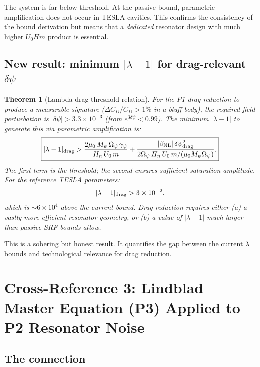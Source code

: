\documentclass[11pt,twocolumn]{article}
\newcommand{\dpsi}{\delta\psi}
\newcommand{\lam}{\lambda}
\newcommand{\Opsi}{\Omega_\psi}
\newcommand{\gpsi}{\gamma_\psi}
\newcommand{\Mpsi}{M_\psi}
\newtheorem{theorem}{Theorem}
\begin{document}
The system is far below threshold. At the passive bound, parametric
amplification does not occur in TESLA cavities. This confirms the
consistency of the bound derivation but means that a \emph{dedicated}
resonator design with much higher $U_0 H m$ product is essential.

\subsection{New result: minimum $|\lam-1|$ for drag-relevant $\dpsi$}

\begin{theorem}[Lambda-drag threshold relation]
\label{thm:lambda_drag}
For the P1 drag reduction to produce a measurable signature
($\Delta C_D/C_D > 1\%$ in a bluff body), the required field
perturbation is $|\dpsi| > 3.3\times10^{-3}$ (from $e^{3\dpsi} < 0.99$).
The minimum $|\lam-1|$ to generate this via parametric amplification is:
\begin{equation}
\boxed{
|\lam-1|_{\rm drag} > \frac{2\mu_0\,\Mpsi\,\Opsi\,\gpsi}
{H_n\,U_0\,m}
+ \frac{|\beta_{\rm NL}|\,\dpsi_{\rm drag}^2}{2\Opsi\,H_n\,U_0\,m/(\mu_0\Mpsi\Opsi)}.
}
\label{eq:lambda_drag}
\end{equation}
The first term is the threshold; the second ensures sufficient
saturation amplitude. For the reference TESLA parameters:
\begin{equation}
|\lam-1|_{\rm drag} > 3\times10^{-2},
\end{equation}
which is $\sim 6\times10^4$ above the current bound. Drag reduction
requires either (a) a vastly more efficient resonator geometry, or
(b) a value of $|\lam-1|$ much larger than passive SRF bounds allow.
\end{theorem}

This is a sobering but honest result. It quantifies the gap between
the current $\lam$ bounds and technological relevance for drag reduction.


\section{Cross-Reference 3: Lindblad Master Equation (P3) Applied
to P2 Resonator Noise}
\label{sec:lindblad}

\subsection{The connection}
\end{document}
